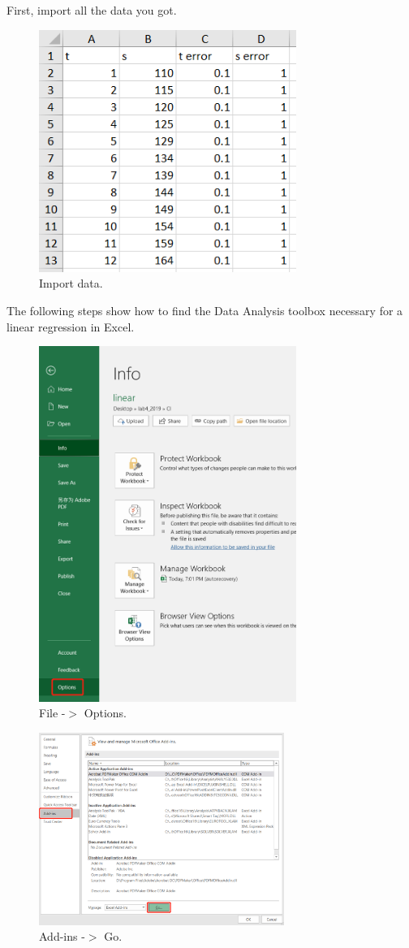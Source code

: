 \documentclass[12pt]{article}
\begin{document}
First, import all the data you got. 

\begin{figure}[H]
\centering
\includegraphics[width=8.4cm]{e0.png}
\caption{Import data.}
\end{figure}

The following steps show how to find the \textsf{Data Analysis} toolbox necessary for a linear regression in \textsf{Excel}.

\begin{figure}[H]
\centering
\includegraphics[width=8.4cm]{e4.png}
\caption{File -$>$ Options.}
\end{figure}

\begin{figure}[H]
\centering
\includegraphics[width=8cm]{e5.png}
\caption{Add-ins -$>$ Go.}
\end{figure}
\end{document}
